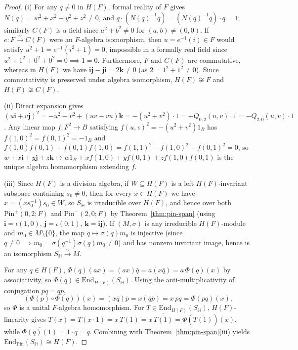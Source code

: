 \documentclass[11pt,a4paper]{article}
\theoremstyle{plain}
\theoremstyle{definition}
\newcommand{\Pin}{\mathrm{Pin}}
\newcommand{\End}{\mathrm{End}}
\newcommand{\HH}{\mathbb{H}}
\begin{document}
\begin{proof}
(i) For any $q \neq 0$ in $H(F)$, formal reality of $F$ gives $N(q) = w^2 + x^2 + y^2 + z^2 \neq 0$, and $q \cdot (N(q)^{-1}\bar{q}) = (N(q)^{-1}\bar{q})\cdot q = 1$; similarly $C(F)$ is a field since $a^2 + b^2 \neq 0$ for $(a,b) \neq (0,0)$. If $e : F \xrightarrow{\sim} C(F)$ were an $F$-algebra isomorphism, then $u = e^{-1}(i) \in F$ would satisfy $u^2 + 1 = e^{-1}(i^2 + 1) = 0$, impossible in a formally real field since $u^2 + 1^2 + 0^2 + 0^2 = 0 \implies 1 = 0$. Furthermore, $F$ and $C(F)$ are commutative, whereas in $H(F)$ we have $\mathbf{i}\mathbf{j} - \mathbf{j}\mathbf{i} = 2\mathbf{k} \neq 0$ (as $2 = 1^2 + 1^2 \neq 0$). Since commutativity is preserved under algebra isomorphism, $H(F) \not\cong F$ and $H(F) \not\cong C(F)$.

(ii) Direct expansion gives $(u\mathbf{i} + v\mathbf{j})^2 = -u^2 - v^2 + (uv - vu)\mathbf{k} = -(u^2 + v^2)\cdot 1 = +Q_{0,2}(u,v)\cdot 1 = -Q_{2,0}(u,v)\cdot 1$. Any linear map $f : F^2 \to B$ satisfying $f(u,v)^2 = -(u^2+v^2)1_B$ has $f(1,0)^2 = f(0,1)^2 = -1_B$ and $f(1,0)f(0,1) + f(0,1)f(1,0) = f(1,1)^2 - f(1,0)^2 - f(0,1)^2 = 0$, so $w + x\mathbf{i} + y\mathbf{j} + z\mathbf{k} \mapsto w 1_B + x f(1,0) + y f(0,1) + z f(1,0)f(0,1)$ is the unique algebra homomorphism extending $f$.

(iii) Since $H(F)$ is a division algebra, if $W \subseteq H(F)$ is a left $H(F)$-invariant subspace containing $s_0 \neq 0$, then for every $x \in H(F)$ we have $x = (x s_0^{-1}) s_0 \in W$, so $S_{\HH}$ is irreducible over $H(F)$, and hence over both $\Pin^+(0,2;F)$ and $\Pin^-(2,0;F)$ by Theorem~\ref{thm:pin-span} (using $\mathbf{i} = \iota(1,0)$, $\mathbf{j} = \iota(0,1)$, $\mathbf{k} = \mathbf{i}\mathbf{j}$). If $(M, \sigma)$ is any irreducible $H(F)$-module and $m_0 \in M \setminus \{0\}$, the map $q \mapsto \sigma(q)m_0$ is injective (since $q \neq 0 \implies m_0 = \sigma(q^{-1})\sigma(q)m_0 \neq 0$) and has nonzero invariant image, hence is an isomorphism $S_{\HH} \xrightarrow{\sim} M$.

For any $q \in H(F)$, $\Phi(q)(ax) = (ax)\bar{q} = a(x\bar{q}) = a\,\Phi(q)(x)$ by associativity, so $\Phi(q) \in \End_{H(F)}(S_{\HH})$. Using the anti-multiplicativity of conjugation $\overline{p q} = \bar{q}\bar{p}$,
\[
  (\Phi(p) \circ \Phi(q))(x) = (x \bar{q})\bar{p} = x(\bar{q}\bar{p}) = x\,\overline{p q} = \Phi(p q)(x),
\]
so $\Phi$ is a unital $F$-algebra homomorphism. For $T \in \End_{H(F)}(S_{\HH})$, $H(F)$-linearity gives $T(x) = T(x \cdot 1) = x \, T(1) = x \, \overline{\overline{T(1)}} = \Phi(\overline{T(1)})(x)$, while $\overline{\Phi(q)(1)} = \overline{1 \cdot \bar{q}} = q$. Combining with Theorem~\ref{thm:pin-span}(iii) yields $\End_{\Pin}(S_{\HH}) \cong H(F)$.


\end{proof}
\end{document}

